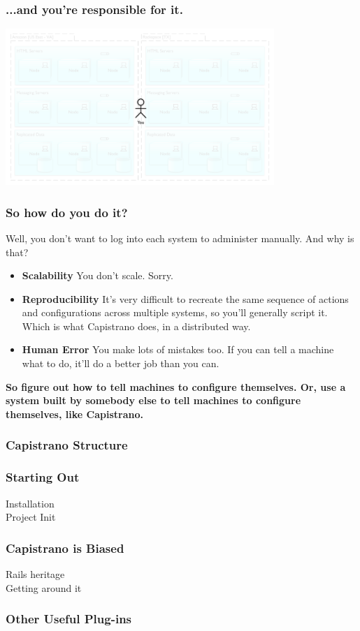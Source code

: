 \documentclass[t,handout]{beamer}
\begin{document}
\begin{frame}
\frametitle{...and you're responsible for it.}
\begin{center}
\includegraphics[width = 4in]{cap-distributed-you.pdf}
\end{center}
\transfade
\end{frame}

\begin{frame}
\frametitle{So how do you do it?}
Well, you don't want to log into each system to administer manually.  And why is that?
\begin{small}
\begin{itemize}
\item {\bf Scalability} You don't scale.  Sorry.
\item {\bf Reproducibility}  It's very difficult to recreate the same sequence of actions and configurations across multiple systems, so you'll generally script it.  Which is what Capistrano does, in a distributed way.
\item {\bf Human Error} You make lots of mistakes too.  If you can tell a machine what to do, it'll do a better job than you can.
\end{itemize}
\end{small}
\begin{center}
{\bf So figure out how to tell machines to configure themselves.  Or, use a system built by somebody else to tell machines to configure themselves, like Capistrano.}
\end{center}
\end{frame}

\begin{frame}
\frametitle{Capistrano Structure}
\end{frame}

\begin{frame}
\frametitle{Starting Out}
Installation \\
Project Init\
\end{frame}

\begin{frame}
\frametitle{Capistrano is Biased}
Rails heritage \\
Getting around it
\end{frame}

\begin{frame}
\frametitle{Other Useful Plug-ins}
\end{frame}
\end{document}
